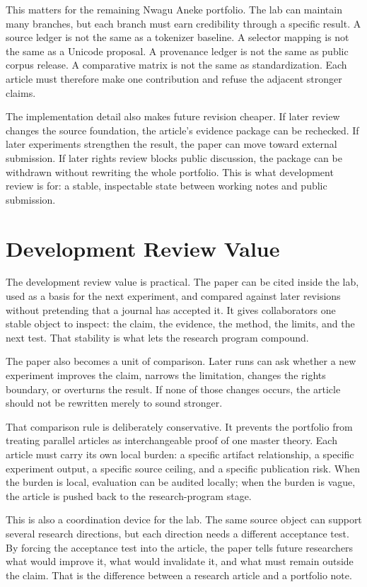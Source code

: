 \documentclass[sigconf,nonacm]{acmart}
\begin{document}
This matters for the remaining Nwagu Aneke portfolio. The lab can maintain many
branches, but each branch must earn credibility through a specific result. A source
ledger is not the same as a tokenizer baseline. A selector mapping is not the
same as a Unicode proposal. A provenance ledger is not the same as public corpus
release. A comparative matrix is not the same as standardization. Each article
must therefore make one contribution and refuse the adjacent stronger claims.

The implementation detail also makes future revision cheaper. If later review
changes the source foundation, the article's evidence package can be rechecked. If later
experiments strengthen the result, the paper can move toward external
submission. If later rights review blocks public discussion, the package can be
withdrawn without rewriting the whole portfolio. This is what development
review is for: a stable, inspectable state between working notes and public
submission.

\section{Development Review Value}
The development review value is practical. The paper can be cited inside the lab,
used as a basis for the next experiment, and compared against later revisions
without pretending that a journal has accepted it. It gives collaborators one
stable object to inspect: the claim, the evidence, the method, the limits, and
the next test. That stability is what lets the research program compound.

The paper also becomes a unit of comparison. Later runs can ask whether a new
experiment improves the claim, narrows the limitation, changes the rights
boundary, or overturns the result. If none of those changes occurs, the article
should not be rewritten merely to sound stronger.

That comparison rule is deliberately conservative. It prevents the portfolio
from treating parallel articles as interchangeable proof of one master theory.
Each article must carry its own local burden: a specific artifact relationship,
a specific experiment output, a specific source ceiling, and a specific
publication risk. When the burden is local, evaluation can be audited locally; when
the burden is vague, the article is pushed back to the research-program stage.

This is also a coordination device for the lab. The same source object can
support several research directions, but each direction needs a different
acceptance test. By forcing the acceptance test into the article, the paper tells
future researchers what would improve it, what would invalidate it, and what
must remain outside the claim. That is the difference between a research article
and a portfolio note.
\end{document}
